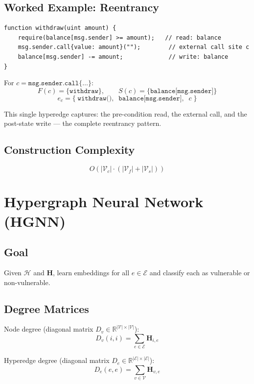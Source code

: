 \documentclass[11pt]{article}
\begin{document}
\subsection{Worked Example: Reentrancy}

\begin{lstlisting}[language={}]
function withdraw(uint amount) {
    require(balance[msg.sender] >= amount);   // read: balance
    msg.sender.call{value: amount}("");        // external call site c
    balance[msg.sender] -= amount;             // write: balance
}
\end{lstlisting}

For $c = \texttt{msg.sender.call\{\ldots\}}$:
\[
F(c) = \{\texttt{withdraw}\}, \qquad S(c) = \{\texttt{balance[msg.sender]}\}
\]
\[
e_c = \{\;\texttt{withdraw()},\;\; \texttt{balance[msg.sender]},\;\; c\;\}
\]

This single hyperedge captures: the pre-condition read, the external call, and the post-state write --- the complete reentrancy pattern.

\subsection{Construction Complexity}

\[
O\!\left(|\mathcal{V}_c| \cdot \left(|\mathcal{V}_f| + |\mathcal{V}_s|\right)\right)
\]

\section{Hypergraph Neural Network (HGNN)}

\subsection{Goal}

Given $\mathcal{H}$ and $\mathbf{H}$, learn embeddings for all $e \in \mathcal{E}$ and classify each as vulnerable or non-vulnerable.

\subsection{Degree Matrices}

Node degree (diagonal matrix $D_v \in \mathbb{R}^{|\mathcal{V}| \times |\mathcal{V}|}$):
\[
D_v(i,i) = \sum_{e \in \mathcal{E}} \mathbf{H}_{i,e}
\]

Hyperedge degree (diagonal matrix $D_e \in \mathbb{R}^{|\mathcal{E}| \times |\mathcal{E}|}$):
\[
D_e(e,e) = \sum_{v \in \mathcal{V}} \mathbf{H}_{v,e}
\]
\end{document}
